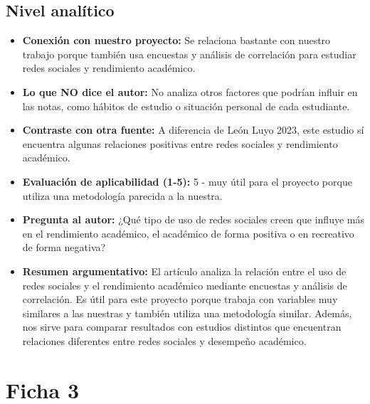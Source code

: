 \documentclass[12pt]{article}
\begin{document}
\subsection*{Nivel analítico}
\begin{itemize}
  \item \textbf{Conexión con nuestro proyecto:} Se relaciona bastante con nuestro trabajo porque también usa encuestas y análisis de correlación para estudiar redes sociales y rendimiento académico.
  \item \textbf{Lo que NO dice el autor:} No analiza otros factores que podrían influir en las notas, como hábitos de estudio o situación personal de cada estudiante.
  \item \textbf{Contraste con otra fuente:} A diferencia de León Luyo 2023, este estudio sí encuentra algunas relaciones positivas entre redes sociales y rendimiento académico.
  \item \textbf{Evaluación de aplicabilidad (1-5):} 5 - muy útil para el proyecto porque utiliza una metodología parecida a la nuestra.
  \item \textbf{Pregunta al autor:} ¿Qué tipo de uso de redes sociales creen que influye más en el rendimiento académico, el académico de forma positiva o en recreativo de forma negativa?
  \item \textbf{Resumen argumentativo:} El artículo analiza la relación entre el uso de redes sociales y el rendimiento académico mediante encuestas y análisis de correlación. Es útil para este proyecto porque trabaja con variables muy similares a las nuestras y también utiliza una metodología similar. Además, nos sirve para comparar resultados con estudios distintos que encuentran relaciones diferentes entre redes sociales y desempeño académico.
\end{itemize}

\section*{Ficha 3}
\end{document}
